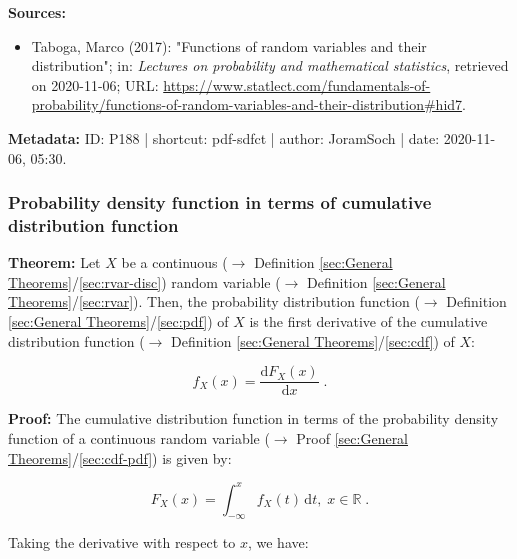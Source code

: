 \documentclass[a4paper,12pt,twoside]{book}
\begin{document}
\vspace{1em}
\textbf{Sources:}
\begin{itemize}
\item Taboga, Marco (2017): "Functions of random variables and their distribution"; in: \textit{Lectures on probability and mathematical statistics}, retrieved on 2020-11-06; URL: \url{https://www.statlect.com/fundamentals-of-probability/functions-of-random-variables-and-their-distribution#hid7}.
\end{itemize}


\vspace{1em}
\textbf{Metadata:} ID: P188 | shortcut: pdf-sdfct | author: JoramSoch | date: 2020-11-06, 05:30.
\vspace{1em}



\subsubsection[\textbf{Probability density function in terms of cumulative distribution function}]{Probability density function in terms of cumulative distribution function} \label{sec:pdf-cdf}
\setcounter{equation}{0}

\textbf{Theorem:} Let $X$ be a continuous ($\rightarrow$ Definition \ref{sec:General Theorems}/\ref{sec:rvar-disc}) random variable ($\rightarrow$ Definition \ref{sec:General Theorems}/\ref{sec:rvar}). Then, the probability distribution function ($\rightarrow$ Definition \ref{sec:General Theorems}/\ref{sec:pdf}) of $X$ is the first derivative of the cumulative distribution function ($\rightarrow$ Definition \ref{sec:General Theorems}/\ref{sec:cdf}) of $X$:

\begin{equation} \label{eq:pdf-cdf-pdf-cdf}
f_X(x) = \frac{\mathrm{d}F_X(x)}{\mathrm{d}x} \; .
\end{equation}


\vspace{1em}
\textbf{Proof:} The cumulative distribution function in terms of the probability density function of a continuous random variable ($\rightarrow$ Proof \ref{sec:General Theorems}/\ref{sec:cdf-pdf}) is given by:

\begin{equation} \label{eq:pdf-cdf-cdf-pdf}
F_X(x) = \int_{-\infty}^{x} f_X(t) \, \mathrm{d}t, \; x \in \mathbb{R} \; .
\end{equation}

Taking the derivative with respect to $x$, we have:
\end{document}
